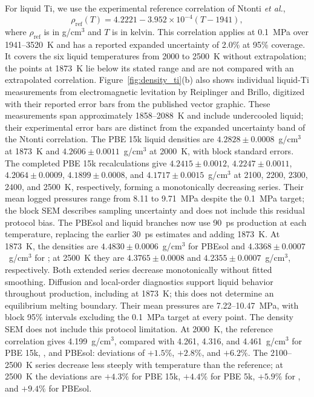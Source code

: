 For liquid Ti, we use the experimental reference correlation of Ntonti \textit{et al.},\cite{Ntonti2024}
\begin{equation}
\rho_{\mathrm{ref}}(T)=4.2221-3.952\times10^{-4}(T-1941),
\label{eq:ti_liquid_density_reference}
\end{equation}
where $\rho_{\mathrm{ref}}$ is in g/cm$^3$ and $T$ is in kelvin.
This correlation applies at 0.1~MPa over 1941--3520~K and has a reported expanded uncertainty of 2.0\% at 95\% coverage.
It covers the six liquid temperatures from 2000 to 2500~K without extrapolation; the points at 1873~K lie below its stated range and are not compared with an extrapolated correlation.
Figure~\ref{fig:density_ti}(b) also shows individual liquid-Ti measurements from electromagnetic levitation by Reiplinger and Brillo,\cite{Reiplinger2022} digitized with their reported error bars from the published vector graphic.
These measurements span approximately 1858--2088~K and include undercooled liquid; their experimental error bars are distinct from the expanded uncertainty band of the Ntonti correlation.
The PBE 15k liquid densities are $4.2828\pm0.0008$~g/cm$^3$ at 1873~K and $4.2606\pm0.0011$~g/cm$^3$ at 2000~K, with block standard errors.
The completed PBE 15k recalculations give $4.2415\pm0.0012$, $4.2247\pm0.0011$, $4.2064\pm0.0009$, $4.1899\pm0.0008$, and $4.1717\pm0.0015$~g/cm$^3$ at 2100, 2200, 2300, 2400, and 2500~K, respectively, forming a monotonically decreasing series.
Their mean logged pressures range from 8.11 to 9.71~MPa despite the 0.1~MPa target; the block SEM describes sampling uncertainty and does not include this residual protocol bias.
The PBEsol and \rscan{} liquid branches now use 90~ps production at each temperature, replacing the earlier 30~ps estimates and adding 1873~K.
At 1873~K, the densities are $4.4830\pm0.0006$~g/cm$^3$ for PBEsol and $4.3368\pm0.0007$~g/cm$^3$ for \rscan{}; at 2500~K they are $4.3765\pm0.0008$ and $4.2355\pm0.0007$~g/cm$^3$, respectively.
Both extended series decrease monotonically without fitted smoothing. Diffusion and local-order diagnostics support liquid behavior throughout production, including at 1873~K; this does not determine an equilibrium melting boundary.
Their mean pressures are 7.22--10.47~MPa, with block 95\% intervals excluding the 0.1~MPa target at every point. The density SEM does not include this protocol limitation.
At 2000~K, the reference correlation gives 4.199~g/cm$^3$, compared with 4.261, 4.316, and 4.461~g/cm$^3$ for PBE 15k, \rscan{}, and PBEsol: deviations of $+1.5\%$, $+2.8\%$, and $+6.2\%$.
The 2100--2500~K series decrease less steeply with temperature than the reference; at 2500~K the deviations are $+4.3\%$ for PBE 15k, $+4.4\%$ for PBE 5k, $+5.9\%$ for \rscan{}, and $+9.4\%$ for PBEsol.
